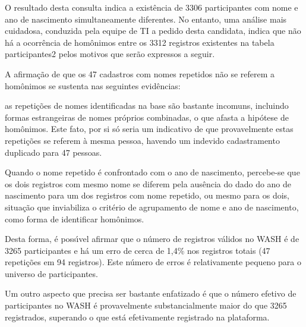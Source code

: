 \documentclass[
12pt,		%
openright,	%
twoside,  %
a4paper,			%
chapter=TITLE,		%
english,			%
french,				%
spanish,			%
brazil				%
]{USPSC-classe/USPSC_RedarTex}
\begin{document}
O resultado desta consulta indica a exist\^encia de 3306 participantes com nome e ano de nascimento simultaneamente diferentes. No entanto, uma an\'alise mais cuidadosa, conduzida pela equipe de TI a pedido desta candidata, indica que n\~ao h\'a a ocorr\^encia de hom\^onimos entre os 3312 registros existentes na tabela  participantes2 pelos motivos que ser\~ao expressos a seguir.








A afirma\c{c}\~ao de que os 47 cadastros com nomes repetidos n\~ao se referem a hom\^onimos se sustenta nas seguintes evid\^encias:









\begin{alineas}
\item as repeti\c{c}\~oes de nomes identificadas na base s\~ao bastante incomuns, incluindo formas estrangeiras de nomes pr\'oprios combinadas, o que afasta a hip\'otese de hom\^onimos. Este fato, por si s\'o seria um indicativo de que provavelmente estas repeti\c{c}\~oes se referem \`a mesma pessoa, havendo um indevido cadastramento duplicado para 47 pessoas.
\item Quando o nome repetido \'e confrontado com o ano de nascimento, percebe-se que os dois registros com mesmo nome se diferem pela aus\^encia do dado do ano de nascimento para um dos registros com nome repetido, ou mesmo para os dois, situa\c{c}\~ao que inviabiliza o crit\'erio de agrupamento de nome e ano de nascimento, como forma de identificar hom\^onimos.
\end{alineas}

Desta forma, \'e poss\'{\i}vel afirmar que o n\'umero de registros v\'alidos no WASH \'e de 3265 participantes e h\'a um erro de cerca de 1,4\% nos registros totais (47 repeti\c{c}\~oes em 94 registros). Este n\'umero de erros \'e relativamente pequeno para o universo de participantes.








Um outro aspecto que precisa ser bastante enfatizado \'e que o n\'umero efetivo de participantes no WASH \'e provavelmente substancialmente maior do que 3265 registrados, superando o que est\'a efetivamente registrado na plataforma.
\end{document}
